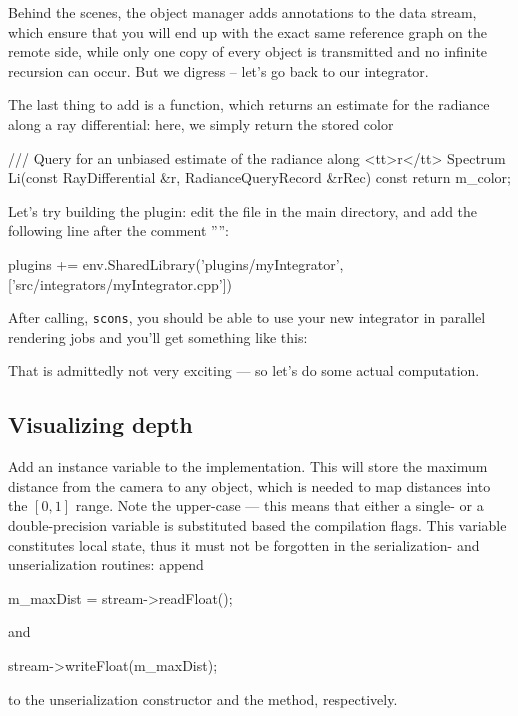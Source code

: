 Behind the scenes, the object manager adds annotations to the data stream,
which ensure that you will end up with the exact same reference graph on the
remote side, while only one copy of every object is transmitted and no 
infinite recursion can occur. But we digress -- let's go back to our integrator.
\vspace{3mm}

The last thing to add is a function, which returns an estimate for the
radiance along a ray differential: here, we simply return the stored color
\begin{cpp}
    /// Query for an unbiased estimate of the radiance along <tt>r</tt>
   Spectrum Li(const RayDifferential &r, RadianceQueryRecord &rRec) const {
       return m_color;
   }
\end{cpp}

Let's try building the plugin: edit the  file in the main
directory, and add the following line after the comment '''':
\begin{cpp}
plugins += env.SharedLibrary('plugins/myIntegrator', ['src/integrators/myIntegrator.cpp'])
\end{cpp}
After calling, \texttt{scons}, you should be able to use your new integrator
in parallel rendering jobs and you'll get something like this:
\begin{center}
\end{center}
That is admittedly not very exciting --- so let's do some actual computation.
\subsection{Visualizing depth}
Add an instance variable  to the implementation. This
will store the maximum distance from the camera to any object, which is needed
to map distances into the $[0,1]$ range. Note the upper-case  --- 
this means that either a single- or a double-precision variable is 
substituted based the compilation flags. This variable constitutes local
state, thus it must not be forgotten in the serialization- and unserialization routines:
append
\begin{cpp}
	m_maxDist = stream->readFloat();
\end{cpp}
and
\begin{cpp}
	stream->writeFloat(m_maxDist);
\end{cpp}
to the unserialization constructor and the  method, respectively.

